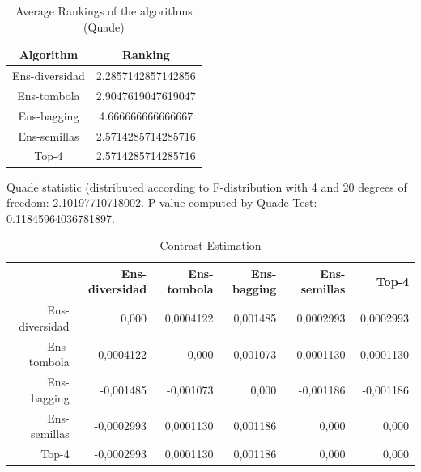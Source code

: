 \documentclass[a4paper,10pt]{article}
\begin{document}
\begin{landscape}
\newpage

\begin{table}[!htp]
\centering
\caption{Average Rankings of the algorithms (Quade)
}\begin{tabular}{c|c}
Algorithm&Ranking\\
\hline
Ens-diversidad&2.2857142857142856\\
Ens-tombola&2.9047619047619047\\
Ens-bagging&4.666666666666667\\
Ens-semillas&2.5714285714285716\\
Top-4&2.5714285714285716\\
\end{tabular}
\end{table}
Quade statistic (distributed according to F-distribution with 4 and 20 degrees of freedom: 2.10197710718002. 
P-value computed by Quade Test: 0.11845964036781897.\newline


\newpage

\begin{table}[!htp]
\centering\tiny
\caption{Contrast Estimation}
\begin{tabular}{
|r|r|r|r|r|r|}
\hline
 &Ens-diversidad&Ens-tombola&Ens-bagging&Ens-semillas&Top-4\\
\hline
Ens-diversidad&0,000&0,0004122&0,001485&0,0002993&0,0002993\\
\hline
Ens-tombola&-0,0004122&0,000&0,001073&-0,0001130&-0,0001130\\
\hline
Ens-bagging&-0,001485&-0,001073&0,000&-0,001186&-0,001186\\
\hline
Ens-semillas&-0,0002993&0,0001130&0,001186&0,000&0,000\\
\hline
Top-4&-0,0002993&0,0001130&0,001186&0,000&0,000\\
\hline

\end{tabular}
\end{table}

\newpage


\end{landscape}
\end{document}
